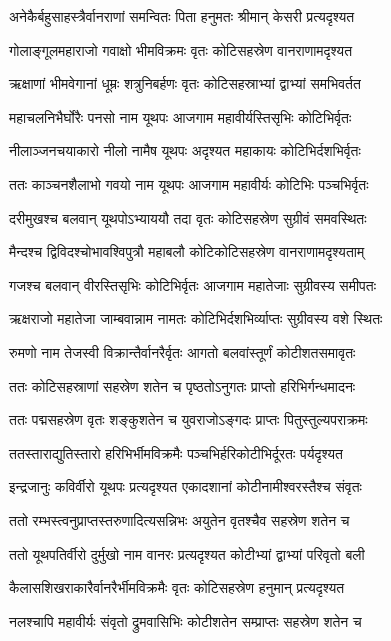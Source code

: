 \twolineshloka
{अनेकैर्बहुसाहस्त्रैर्वानराणां समन्वितः}
{पिता हनुमतः श्रीमान् केसरी प्रत्यदृश्यत} %

\twolineshloka
{गोलाङ्गूलमहाराजो गवाक्षो भीमविक्रमः}
{वृतः कोटिसहस्रेण वानराणामदृश्यत} %

\twolineshloka
{ऋक्षाणां भीमवेगानां धूम्रः शत्रुनिबर्हणः}
{वृतः कोटिसहस्राभ्यां द्वाभ्यां समभिवर्तत} %

\twolineshloka
{महाचलनिभैर्घोरैः पनसो नाम यूथपः}
{आजगाम महावीर्यस्तिसृभिः कोटिभिर्वृतः} %

\twolineshloka
{नीलाञ्जनचयाकारो नीलो नामैष यूथपः}
{अदृश्यत महाकायः कोटिभिर्दशभिर्वृतः} %

\twolineshloka
{ततः काञ्चनशैलाभो गवयो नाम यूथपः}
{आजगाम महावीर्यः कोटिभिः पञ्चभिर्वृतः} %

\twolineshloka
{दरीमुखश्च बलवान् यूथपोऽभ्याययौ तदा}
{वृतः कोटिसहस्रेण सुग्रीवं समवस्थितः} %

\twolineshloka
{मैन्दश्च द्विविदश्चोभावश्विपुत्रौ महाबलौ}
{कोटिकोटिसहस्रेण वानराणामदृश्यताम्} %

\twolineshloka
{गजश्च बलवान् वीरस्तिसृभिः कोटिभिर्वृतः}
{आजगाम महातेजाः सुग्रीवस्य समीपतः} %

\twolineshloka
{ऋक्षराजो महातेजा जाम्बवान्नाम नामतः}
{कोटिभिर्दशभिर्व्याप्तः सुग्रीवस्य वशे स्थितः} %

\twolineshloka
{रुमणो नाम तेजस्वी विक्रान्तैर्वानरैर्वृतः}
{आगतो बलवांस्तूर्णं कोटीशतसमावृतः} %

\twolineshloka
{ततः कोटिसहस्राणां सहस्रेण शतेन च}
{पृष्ठतोऽनुगतः प्राप्तो हरिभिर्गन्धमादनः} %

\twolineshloka
{ततः पद्मसहस्रेण वृतः शङ्कुशतेन च}
{युवराजोऽङ्गदः प्राप्तः पितुस्तुल्यपराक्रमः} %

\twolineshloka
{ततस्ताराद्युतिस्तारो हरिभिर्भीमविक्रमैः}
{पञ्चभिर्हरिकोटीभिर्दूरतः पर्यदृश्यत} %

\twolineshloka
{इन्द्रजानुः कविर्वीरो यूथपः प्रत्यदृश्यत}
{एकादशानां कोटीनामीश्वरस्तैश्च संवृतः} %

\twolineshloka
{ततो रम्भस्त्वनुप्राप्तस्तरुणादित्यसन्निभः}
{अयुतेन वृतश्चैव सहस्रेण शतेन च} %

\twolineshloka
{ततो यूथपतिर्वीरो दुर्मुखो नाम वानरः}
{प्रत्यदृश्यत कोटीभ्यां द्वाभ्यां परिवृतो बली} %

\twolineshloka
{कैलासशिखराकारैर्वानरैर्भीमविक्रमैः}
{वृतः कोटिसहस्रेण हनुमान् प्रत्यदृश्यत} %

\twolineshloka
{नलश्चापि महावीर्यः संवृतो द्रुमवासिभिः}
{कोटीशतेन सम्प्राप्तः सहस्रेण शतेन च} %

